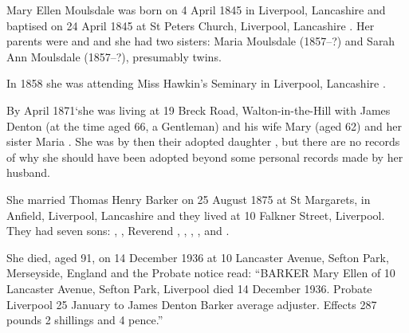 
Mary Ellen Moulsdale was born on 4 April 1845 in Liverpool, Lancashire \cite{MEMoulsdaleBirth} and baptised on 24 April 1845 at St Peters Church, Liverpool, Lancashire \cite{MEMoulsdaleBaptism}. Her parents were  and  and she had two sisters: Maria Moulsdale (1857--?) and Sarah Ann Moulsdale (1857--?), presumably twins. 

In 1858 she was attending Miss Hawkin's Seminary in Liverpool, Lancashire \cite{MEMoulsdaleSchool}.

By April 1871`she was living at 19 Breck Road, Walton-in-the-Hill with James Denton (at the time aged 66, a Gentleman) and his wife Mary (aged 62) and her sister Maria \cite{MEMoulsdaleResidence}.  She was by then their adopted daughter \cite{MEMoulsdaleAdoption},  but there are no records of why she should have been adopted beyond some personal records made by her husband. 

She married Thomas Henry Barker on 25 August 1875 at St Margarets, in Anfield, Liverpool, Lancashire \cite{MEMoulsdaleMarriage} and they lived at 10 Falkner Street, Liverpool.  They had seven sons: , , Reverend , , , , and .

She died, aged 91, on 14 December 1936 at 10 Lancaster Avenue, Sefton Park, Merseyside, England \cite{ToxtethBarker20} and the Probate notice read:
``BARKER Mary Ellen of 10 Lancaster Avenue, Sefton Park, Liverpool died 14 December 1936. Probate Liverpool 25 January to James Denton Barker average adjuster. Effects 287 pounds 2 shillings and 4 pence.''

